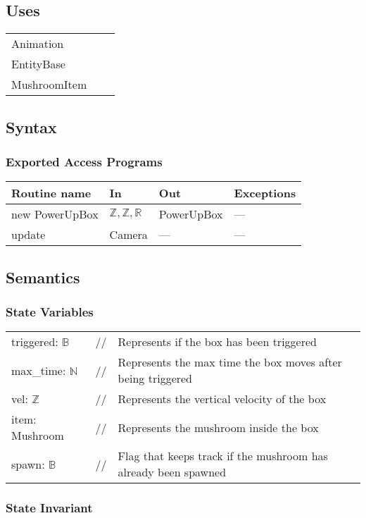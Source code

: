 \documentclass[12pt]{article}
\begin{document}
\subsection* {Uses}

\begin{tabular}{lll}
    Animation & & \\
    EntityBase & & \\
    MushroomItem & &
\end{tabular}

\subsection* {Syntax}

\subsubsection* {Exported Access Programs}

\begin{tabular}{| l | l | l | l |}
\hline
\textbf{Routine name} & \textbf{In} & \textbf{Out} & \textbf{Exceptions}\\
\hline
new PowerUpBox & $\mathbb{Z, Z, R}$ & PowerUpBox & ---\\
\hline
update & Camera & --- & ---\\
\hline
\end{tabular}

\subsection* {Semantics}

\subsubsection* {State Variables}
\begin{tabular}{lll}
triggered: $\mathbb{B}$ & // & Represents if the box has been triggered\\
max\_time: $\mathbb{N}$ & // & Represents the max time the box moves after being triggered\\
vel: $\mathbb{Z}$ & // & Represents the vertical velocity of the box\\
item: Mushroom & // & Represents the mushroom inside the box\\
spawn: $\mathbb{B}$ & // & Flag that keeps track if the mushroom has already been spawned
\end{tabular}

\subsubsection* {State Invariant}
\end{document}

